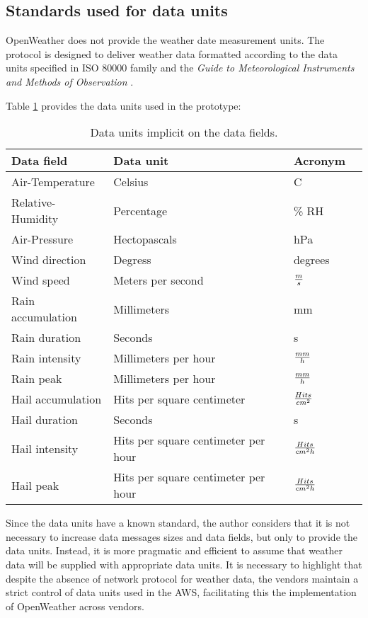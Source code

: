 \subsection{Standards used for data units}

OpenWeather does not provide the  weather date measurement units. The protocol is designed to deliver weather data formatted according to the data units specified in \gls{ISO} 80000 \cite{ISO80000} family and the \emph{Guide to Meteorological Instruments and Methods of Observation} \cite{GMIMO}.

Table \ref{t6.4} provides the data units used in the prototype:

\begin{table}[H]
\centering
    \begin{tabular}{ | l | l | l | l |}
    \hline
    \textbf{Data field} & \textbf{Data unit} & \textbf{Acronym} \\ \hline
    Air-Temperature & Celsius & C\\ \hline
    Relative-Humidity & Percentage& \% RH\\ \hline
    Air-Pressure & Hectopascals & hPa\\ \hline
    Wind direction & Degress & degrees \\ \hline
    Wind speed & Meters per second	& $m \over s$ \\ \hline
    Rain accumulation & Millimeters & mm\\ \hline
    Rain duration & Seconds & s \\ \hline
    Rain intensity & Millimeters per hour & $mm \over h$\\ \hline
    Rain peak &  Millimeters per hour & $mm \over h$ \\ \hline
    Hail accumulation & Hits per square centimeter & $Hits \over cm^2$\\ \hline
    Hail duration & Seconds & s \\ \hline
    Hail intensity & Hits per square centimeter per hour & $Hits \over cm^2 h$ \\ \hline
    Hail peak &  Hits per square centimeter per hour & $Hits \over cm^2 h$ \\ \hline
    \end{tabular}
  \caption{Data units implicit on the data fields.}
  \label{t6.4}
\end{table}

Since the data units have a known standard, the author considers that it is not necessary to increase data messages sizes and data fields, but only to provide the data units. Instead, it is more pragmatic and efficient to assume that weather data will be supplied with appropriate data units. It is necessary to highlight that despite the absence of network protocol for weather data, the vendors maintain a strict control of data units used in the \gls{AWS}, facilitating this the implementation of OpenWeather across vendors.


